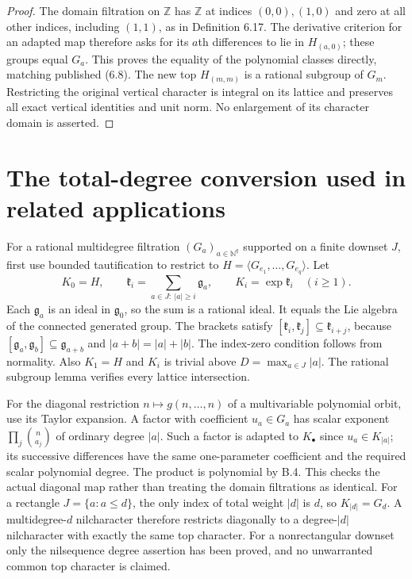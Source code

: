\documentclass[11pt]{article}
\newcommand{\Z}{\mathbb Z}\newcommand{\N}{\mathbb N}
\begin{document}
\begin{proof}
The domain filtration on $\Z$ has $\Z$ at indices $(0,0),(1,0)$
and zero at all other indices, including $(1,1)$, as in Definition 6.17.
The derivative criterion for an adapted
map therefore asks for its $a$th differences to lie in $H_{(a,0)}$;
these groups equal $G_a$. This proves the equality of the polynomial
classes directly, matching published (6.8). The new top
$H_{(m,m)}$ is a rational subgroup of $G_m$. Restricting the original
vertical character is integral on its lattice and preserves all exact
vertical identities and unit norm. No enlargement of its character
domain is asserted.
\end{proof}

\section{The total-degree conversion used in related applications}

For a rational multidegree filtration $(G_a)_{a\in\N^q}$ supported
on a finite downset $J$, first use bounded tautification to restrict
to $H=\langle G_{e_1},\ldots,G_{e_q}\rangle$. Let
\[
 K_0=H,\qquad
 \mathfrak k_i=\sum_{a\in J:\ |a|\geq i}\mathfrak g_a,
 \qquad K_i=\exp\mathfrak k_i\quad(i\geq1).
\]
Each $\mathfrak g_a$ is an ideal in $\mathfrak g_0$, so the sum is
a rational ideal. It equals the Lie algebra of the connected generated
group. The brackets satisfy
$[\mathfrak k_i,\mathfrak k_j]\subseteq\mathfrak k_{i+j}$,
because $[\mathfrak g_a,\mathfrak g_b]\subseteq\mathfrak g_{a+b}$
and $|a+b|=|a|+|b|$. The index-zero condition follows from normality.
Also $K_1=H$ and $K_i$ is trivial above $D=\max_{a\in J}|a|$.
The rational subgroup lemma verifies every lattice intersection.

For the diagonal restriction $n\mapsto g(n,\ldots,n)$ of a
multivariable polynomial orbit, use its Taylor expansion. A factor
with coefficient $u_a\in G_a$ has scalar exponent
$\prod_j\binom n{a_j}$ of ordinary degree $|a|$. Such a factor
is adapted to $K_\bullet$ since $u_a\in K_{|a|}$; its successive
differences have the same one-parameter coefficient and the required
scalar polynomial degree. The product is polynomial by B.4. This
checks the actual diagonal map rather than treating the domain
filtrations as identical. For a rectangle $J=\{a:a\leq d\}$,
the only index of total weight $|d|$ is $d$, so $K_{|d|}=G_d$.
A multidegree-$d$ nilcharacter therefore restricts diagonally to a
degree-$|d|$ nilcharacter with exactly the same top character.
For a nonrectangular downset only the nilsequence degree assertion
has been proved, and no unwarranted common top character is claimed.
\end{document}
